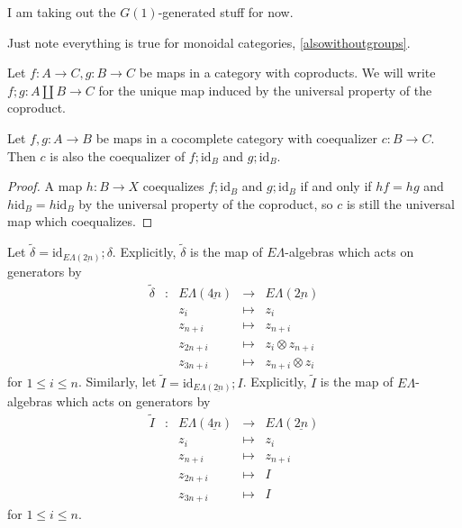 \documentclass{amsbook} %
\newcommand{\id}{\textrm{id}}
\newcommand{\ELnn}{E\Lambda(\underline{2n})}
\newcommand{\ELnnnn}{E\Lambda(\underline{4n})}
\numberwithin{section}{chapter}
\begin{document}
I am taking out the $G(1)$-generated stuff for now.


Just note everything is true for monoidal categories, \cref{alsowithoutgroups}.

\begin{nota}\label{plus_notation}
Let $f: A \to C, g: B \to C$ be maps in a category with coproducts. We will write $f;g: A \coprod B \to C$ for the unique map induced by the universal property of the coproduct.
\end{nota}

\begin{lem}\label{sum_coeq}
Let $f, g: A \to B$ be maps in a cocomplete category with coequalizer $c: B \to C$. Then $c$ is also the coequalizer of $f;\id_B$ and $g; \id_B$.
\end{lem}
\begin{proof}
A map $h: B \to X$ coequalizes $f;\id_B$ and $g; \id_B$ if and only if $hf = hg$ and $h \id_B = h \id_B$ by the universal property of the coproduct, so $c$ is still the universal map which coequalizes.

\end{proof}

\begin{Defi} \label{coprodmapdef} Let $\tilde{\delta} = \mathrm{id}_{\ELnn};\delta$.
Explicitly, $\tilde{\delta}$ is the map of $E\Lambda$-algebras which acts on generators by
\[ \begin{array}{rlrlll}
			\tilde{\delta} & : & \ELnnnn & \to & \ELnn \\
			&  & z_i & \mapsto & z_i  \\
			&  & z_{n+i} & \mapsto & z_{n+i} \\
			&  & z_{2n+i} & \mapsto & z_i \otimes z_{n+i} \\
			&  & z_{3n+i} & \mapsto & z_{n+i} \otimes z_i			
		\end{array}
\]
for $1 \le i \le n$. Similarly, let $\tilde{I} = \mathrm{id}_{\ELnn};I$.
Explicitly, $\tilde{I}$ is the map of $E\Lambda$-algebras which acts on generators by
\[ \begin{array}{rlrlll}
			\tilde{I} & : & \ELnnnn & \to & \ELnn \\
			&  & z_i & \mapsto & z_i  \\
			& & z_{n+i} & \mapsto & z_{n+i} \\
			& & z_{2n+i} & \mapsto & I \\
			&  & z_{3n+i} & \mapsto & I
		\end{array} 
\]
for $1 \le i \le n$. 
\end{Defi}
\end{document}
